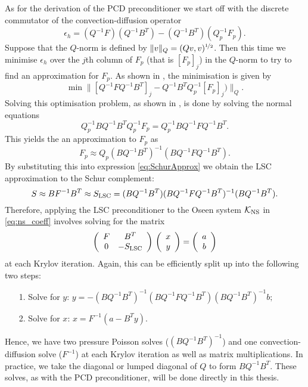 As for the derivation of the PCD preconditioner we start off with the discrete commutator of the convection-diffusion operator
\begin{equation} \nonumber
    \epsilon_h = (Q^{-1}F)(Q^{-1}B^T)-(Q^{-1}B^T)(Q_p^{-1}F_p).
\end{equation}
Suppose that the $Q$-norm is defined by $\|v\|_{Q} = (Qv,v)^{\nicefrac{1}{2}}$. Then this time we minimise $\epsilon_h$ over the $j$th column of $F_p$ (that is $[F_p]_j$) in the $Q$-norm to try to find an approximation for $F_p$. As shown in \cite{elman2005finite}, the minimisation is given by
$$\min \|[Q^{-1}FQ^{-1}B^T]_j-Q^{-1}B^TQ_p^{-1}[F_p]_j) \|_Q.$$
Solving this optimisation problem, as shown in \cite{elman2005finite}, is done by solving the  normal equations
$$Q_p^{-1}BQ^{-1}B^TQ_p^{-1}F_p = Q_p^{-1}BQ^{-1} FQ^{-1}B^T.$$
This yields the an approximation to $F_p$ as
$$F_p \approx Q_p(BQ^{-1}B^T)^{-1}(BQ^{-1} FQ^{-1}B^T).$$
By substituting this into expression \eqref{eq:SchurApprox} we obtain the LSC approximation to the Schur complement:
\begin{equation} \nonumber
    S \approx BF^{-1}B^T \approx S_{\rm LSC} = (B Q^{-1} B^T)(BQ^{-1}FQ^{-1}B^T)^{-1}(B Q^{-1} B^T).
\end{equation}
Therefore, applying the LSC preconditioner to the Oseen system $\mathcal{K}_{\rm NS}$ in \eqref{eq:ns_coeff} involves solving for the matrix
\begin{equation} \nonumber
\left(
\begin{array}{cc}
F & B^T \\
0 & -S_{\rm LSC}
\end{array}
\right)
\,
\left(
\begin{array}{c}
x \\
y
\end{array}
\right) =
\left(
\begin{array}{c}a\\b
\end{array}
\right)
\end{equation}
at each Krylov iteration. Again, this can be efficiently split up into the following two steps:
\begin{itemize}
    \item[1.] Solve for $y$: $y = -(B Q^{-1} B^T)^{-1}(BQ^{-1}FQ^{-1}B^T)(B Q^{-1} B^T)^{-1}b;$
    \item[2.] Solve for $x$: $x = F^{-1}(a-B^Ty).$
\end{itemize}
Hence, we have two pressure Poisson solves ($(B Q^{-1} B^T)^{-1}$) and one convection-diffusion solve ($F^{-1}$) at each Krylov iteration as well as matrix multiplications. In practice, we take the diagonal or lumped diagonal of $Q$ to form $B Q^{-1} B^T$. These solves, as  with the PCD preconditioner, will be done directly in this thesis.

